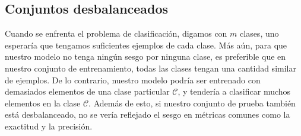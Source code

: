     \subsection{Conjuntos desbalanceados} 
    \label{unbalanced_sets}
    Cuando se enfrenta el problema de clasificación, digamos con $m$ clases, uno esperaría que tengamos suficientes ejemplos de cada clase. Más aún, para que nuestro modelo no tenga ningún sesgo por ninguna clase, es preferible que en nuestro conjunto de entrenamiento, todas las clases tengan una cantidad similar de ejemplos. De lo contrario, nuestro modelo podría ser entrenado con demasiados elementos de una clase particular $\mathcal C$, y tendería a clasificar muchos elementos en la clase $\mathcal C$. Además de esto, si nuestro conjunto de prueba también está desbalanceado, no se vería reflejado el sesgo en métricas comunes como la exactitud y la precisión.


